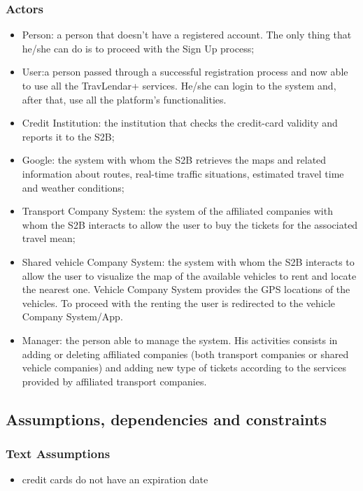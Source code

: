 	\subsubsection{Actors}
			\begin{itemize}
			\item Person: a person that doesn't have a registered account. The only thing that he/she can do is to proceed with the Sign Up process;
			\item User:a person passed through a successful registration process and now
			able to use all the TravLendar+ services. He/she can login to the system and, after that, use all
			the platform's functionalities.
			\item Credit Institution: the institution that checks the credit-card validity and reports it to the S2B;
			\item Google: the system with whom the S2B retrieves the maps and related information about routes, real-time traffic situations, estimated travel time and weather conditions;
			\item Transport Company System: the system of the affiliated companies with whom the S2B interacts to allow the user to buy the tickets for the associated travel mean;
			\item Shared vehicle Company System: the system with whom the S2B interacts to allow the user to visualize the map of the available vehicles to rent and locate the nearest one. Vehicle Company System provides the GPS locations of the vehicles. To proceed with the renting the user is redirected to the vehicle Company System/App.
			\item Manager: the person able to manage the system. His activities consists in adding or deleting affiliated companies (both  transport companies or shared vehicle companies) and adding new type of tickets according to the services provided by affiliated transport companies.
		\end{itemize}
\subsection{Assumptions, dependencies and constraints}
	\subsubsection{Text Assumptions}
		\begin{itemize}
			\item credit cards do not have an expiration date
		\end{itemize}

